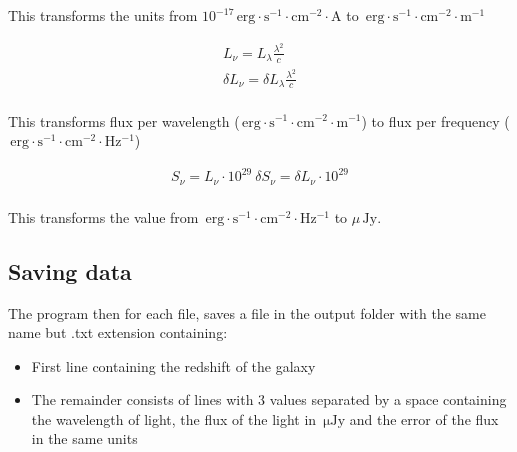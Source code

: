 \documentclass[11pt]{report}
\newcommand{\unit}[1]{\ensuremath{\, \mathrm{#1}}}
\begin{document}
This transforms the units from $10^{-17}\unit{erg\cdot s^{-1}\cdot cm^{-2} \cdot A}$ to $\unit{erg\cdot s^{-1}\cdot cm^{-2} \cdot m^{-1}}$

\begin{align*}
L_\nu = L_\lambda \frac{\lambda^2}{c}\\
\delta L_\nu = \delta L_\lambda \frac{\lambda^2}{c}\\
\end{align*}

This transforms flux per wavelength ($\unit{erg\cdot s^{-1}\cdot cm^{-2} \cdot m^{-1}}$) to flux per frequency ($\unit{erg\cdot s^{-1}\cdot cm^{-2} \cdot Hz^{-1}}$)

\begin{align*}
S_\nu = L_\nu \cdot 10^{29}\
\delta S_\nu = \delta L_\nu \cdot 10^{29}\\
\end{align*}

This transforms the value from $\unit{erg\cdot s^{-1}\cdot cm^{-2} \cdot Hz^{-1}}$ to $\mu \unit{Jy}$.

\subsection{Saving data}

The program then for each file, saves a file in the output folder with the same name but .txt extension containing:
\begin{itemize}
\item First line containing the redshift of the galaxy
\item The remainder consists of lines with 3 values separated by a space containing the wavelength of light, the flux of the light in $\unit{\mu Jy}$ and the error of the flux in the same units
\end{itemize}
\end{document}
